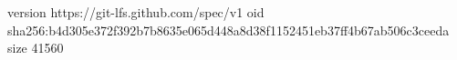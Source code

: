 version https://git-lfs.github.com/spec/v1
oid sha256:b4d305e372f392b7b8635e065d448a8d38f1152451eb37ff4b67ab506c3ceeda
size 41560
